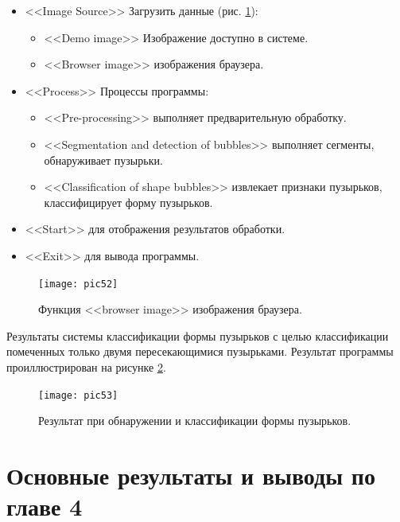 \documentclass[a4paper,14pt]{extreport}
\begin{document}
\begin{itemize}
	\item <<Image Source>> Загрузить данные (рис. \ref{pic52}):

\begin{itemize}
	\item  <<Demo image>> Изображение доступно в системе.
  \item <<Browser image>> изображения браузера.
\end{itemize}

\item <<Process>> Процессы программы:

\begin{itemize}
	\item <<Pre-processing>> выполняет предварительную обработку.
  \item <<Segmentation and detection of bubbles>> выполняет сегменты, обнаруживает пузырьки.
  \item <<Classification of shape bubbles>> извлекает признаки пузырьков, классифицирует форму пузырьков.
\end{itemize}

\item <<Start>> для отображения результатов обработки.
\item <<Exit>> для вывода программы.

\end{itemize}

\begin{figure}[ht!]
\centering
\texttt{[image: pic52]}
\caption{Функция <<browser image>> изображения браузера.}
	\label{pic52}
		\end{figure}
Результаты системы классификации формы пузырьков с целью классификации помеченных только двумя пересекающимися пузырьками. Результат программы проиллюстрирован на рисунке \ref{pic53}.
\begin{figure}[ht!]
\centering
\texttt{[image: pic53]}
\caption{Результат при обнаружении и классификации формы пузырьков.}
	\label{pic53}
		\end{figure}
\section{Основные результаты и выводы по главе 4}
\end{document}
